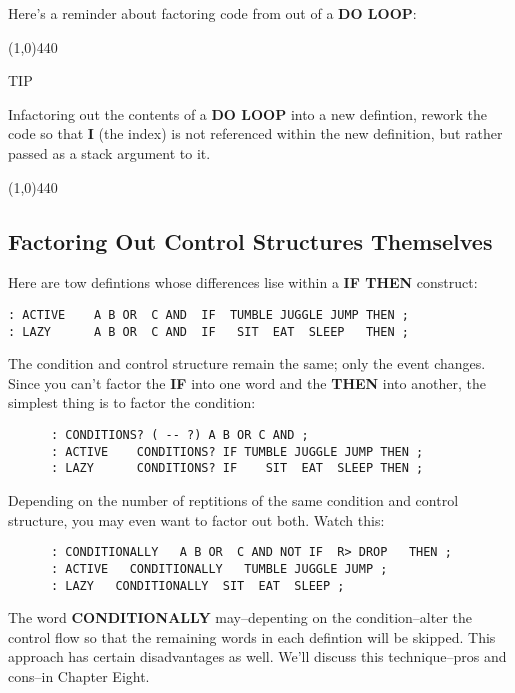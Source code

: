 \documentclass{book}
\begin{document}
Here's a reminder about factoring code from out of a \textbf{DO LOOP}:

\line(1,0){440} 

\begin{list}{}{}

\item
TIP

\item
Infactoring out the contents of a \textbf{DO LOOP} into a new defintion, rework the code so that \textbf{I} (the index) is not referenced within the new definition, but rather passed as a stack argument to it.

\end{list}{}{}

\line(1,0){440}

\subsection*{
	\textbf{Factoring Out Control Structures Themselves}}

Here are tow defintions whose differences lise within a \textbf{IF THEN} construct:

\begin{verbatim}
: ACTIVE    A B OR  C AND  IF  TUMBLE JUGGLE JUMP THEN ;
: LAZY      A B OR  C AND  IF   SIT  EAT  SLEEP   THEN ;
\end{verbatim}

\noindent
The condition and control structure remain the same; only the event changes. Since you can't factor the \textbf{IF} into one word and the \textbf{THEN} into another, the simplest thing is to factor the condition:

\begin{verbatim}
      : CONDITIONS? ( -- ?) A B OR C AND ;
      : ACTIVE    CONDITIONS? IF TUMBLE JUGGLE JUMP THEN ;
      : LAZY      CONDITIONS? IF    SIT  EAT  SLEEP THEN ;
\end{verbatim}

\noindent 
Depending on the number of reptitions of the same condition and control structure, you may even want to factor out both. Watch this:

\begin{verbatim}
      : CONDITIONALLY   A B OR  C AND NOT IF  R> DROP   THEN ;
      : ACTIVE   CONDITIONALLY   TUMBLE JUGGLE JUMP ;
      : LAZY   CONDITIONALLY  SIT  EAT  SLEEP ;
\end{verbatim}

\noindent 
The word \textbf{CONDITIONALLY} may--depenting on the condition--alter the control flow so that the remaining words in each defintion will be skipped. This approach has certain disadvantages as well. We'll discuss this technique--pros and cons--in Chapter Eight.
\end{document}
